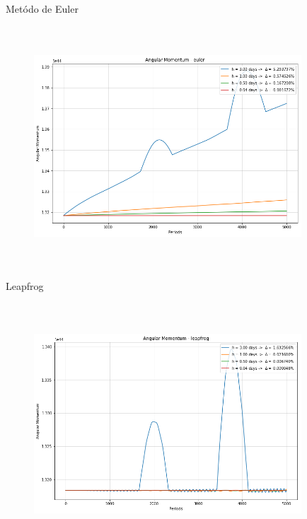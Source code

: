 \documentclass{beamer}
\begin{document}
    \begin{frame}{Metódo de Euler}

      \begin{figure}[h]
        \vspace{-0.5cm}
        \includegraphics[width=100mm, height = 90mm]{resources/an_euler.png}
      \end{figure}

    \end{frame}

    \begin{frame}{Leapfrog}

      \begin{figure}[h]
        \vspace{-0.5cm}
        \includegraphics[width=100mm, height = 90mm]{resources/an_leap.png}
      \end{figure}

    \end{frame}
\end{document}
